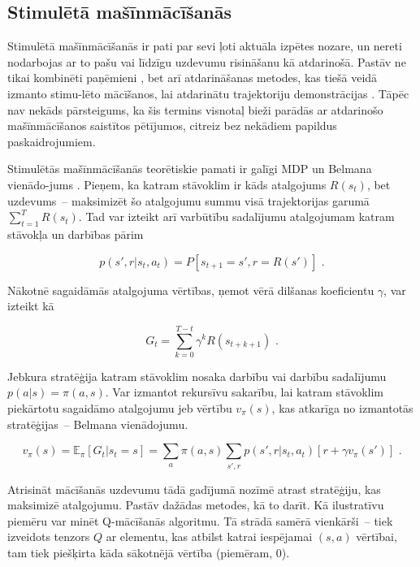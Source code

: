 \documentclass[12pt, a4paper]{article}
\numberwithin{equation}{section} %
\begin{document}
\subsection{Stimulētā mašīnmācīšanās}

Stimulētā mašīnmācīšanās ir pati par sevi ļoti aktuāla izpētes nozare, un nereti nodarbojas ar to pašu vai līdzīgu uzdevumu risināšanu kā atdarinošā. Pastāv ne tikai kombinēti paņēmieni \cite{gupta2019relay, brown2019extrapolating}, bet arī atdarināšanas metodes, kas tiešā veidā izmanto stimu-lēto mācīšanos, lai atdarinātu trajektoriju demonstrācijas \cite{englert2018learning}. Tāpēc nav nekāds pārsteigums, ka šis termins visnotaļ bieži parādās ar atdarinošo mašīnmācīšanos saistītos pētījumos, citreiz bez nekādiem papildus paskaidrojumiem.

Stimulētās mašīnmācīšanās teorētiskie pamati ir galīgi MDP un Belmana vienādo-jums \cite{sutton2018reinforcement}. Pieņem, ka katram stāvoklim ir kāds atalgojums $R(s_t)$, bet uzdevums~-- maksimizēt šo atalgojumu summu visā trajektorijas garumā $\sum_{t=1}^T R(s_t)$. Tad var izteikt arī varbūtību sadalījumu atalgojumam katram stāvokļa un darbības pārim

\begin{equation}
    p(s', r \vert s_t, a_t) = P[s_{t+1}=s', r=R(s')]
\text{ .}
\end{equation}

Nākotnē sagaidāmās atalgojuma vērtības, ņemot vērā dilšanas koeficientu $\gamma$,  var izteikt kā

\begin{equation}
    G_t = \sum_{k=0}^{T-t} \gamma^k R(s_{t+k+1})
\text{ .}
\end{equation}

Jebkura stratēģija katram stāvoklim nosaka darbību vai darbību sadalījumu $p(a \vert s) = \pi(a,s)$. Var izmantot rekursīvu sakarību, lai katram stāvoklim piekārtotu sagaidāmo atalgojumu jeb vērtību $v_{\pi}(s)$, kas atkarīga no izmantotās stratēģijas~-- Belmana vienādojumu.

\begin{equation}
    v_{\pi}(s) = \mathbb{E}_{\pi}[G_t \vert s_t = s] = \sum_{a}\pi(a,s)\sum_{s', r}p(s', r \vert s_t, a_t)[r + \gamma v_{\pi}(s')]
\text{ .}
\end{equation}

Atrisināt mācīšanās uzdevumu tādā gadījumā nozīmē atrast stratēģiju, kas maksimizē atalgojumu. Pastāv dažādas metodes, kā to darīt. Kā ilustratīvu piemēru var minēt Q-mācīšanās algoritmu. Tā strādā samērā vienkārši~-- tiek izveidots tenzors $Q$ ar elementu, kas atbilst katrai iespējamai $(s,a)$ vērtībai, tam tiek piešķirta kāda sākotnējā vērtība (piemēram, 0). 
\end{document}
